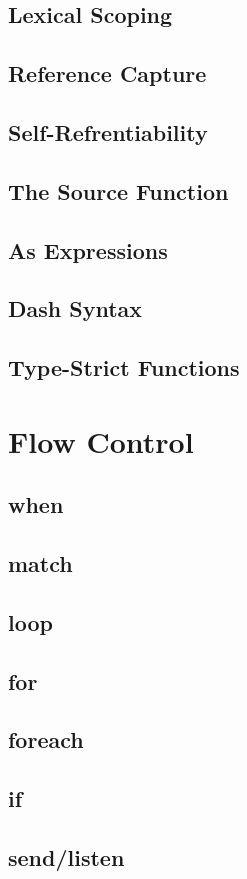 \documentclass[12pt,letterpaper]{report}
\begin{document}
\section{Lexical Scoping}
\section{Reference Capture}
\section{Self-Refrentiability}
\section{The Source Function}
\section{As Expressions}
\section{Dash Syntax}
\section{Type-Strict Functions}
\chapter{Flow Control}
\section{when}
\section{match}
\section{loop}
\section{for}
\section{foreach}
\section{if}
\section{send/listen}
\end{document}
